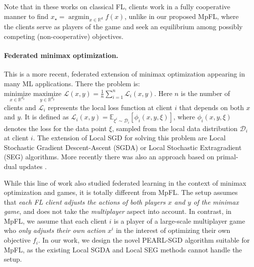 \documentclass{article}
\newcommand{\algname}[1]{{\color{PineGreen}\sf  #1}\xspace}
\newcommand{\cD}{{\mathcal{D}}}
\newcommand{\cL}{{\mathcal{L}}}
\DeclareMathOperator*{\argmin}{argmin}
\newcommand{\reals}{\mathbb{R}}
\newcommand{\abbvname}{\algname{PEARL-SGD}}
\theoremstyle{plain}
\theoremstyle{remark}
\begin{document}
Note that in these works on classical FL, clients work in a fully cooperative manner to find $x_\star = \argmin_{x\in \reals^d} f(x)$, unlike in our proposed MpFL, where the clients serve as players of the game and seek an equilibrium among possibly competing (non-cooperative) objectives.

\paragraph{Federated minimax optimization.}
This is a more recent, federated extension of minimax optimization appearing in many ML applications. 
There the problem is: 
$\underset{x\in \reals^{d_x}}{\textrm{minimize}} \,\, \underset{y\in \reals^{d_y}}{\textrm{maximize}} \,\, \cL(x,y) = \frac{1}{n} \sum_{i=1}^n \cL_i (x,y)$.
Here $n$ is the number of clients and $\cL_i$ represents the local loss function at client $i$ that depends on both $x$ and $y$.
It is defined as $\cL_i (x,y)= \mathbb{E}_{\xi^i \sim \cD_i} [\phi_i(x, y,\xi)]$, 
where $\phi_i(x, y,\xi)$ denotes the loss for the data point $\xi$, sampled from the local data distribution $\cD_i$ at client $i$. 
The extension of Local SGD for solving this problem are Local Stochastic Gradient Descent-Ascent (SGDA) \citep{deng2021local, sharma2022federated} or Local Stochastic Extragradient (SEG) \citep{beznosikov2020distributed,beznosikov2022decentralized} algorithms.
More recently there was also an approach based on primal-dual updates \citep{CondatRichtarik2022_randprox}.

While this line of work also studied federated learning in the context of minimax optimization and games, it is totally different from MpFL. 
The setup assumes that \emph{each FL client adjusts the actions of both players $x$ and $y$ of the minimax game}, and does not take the \emph{multiplayer} aspect into account. 
In contrast, in MpFL, we assume that each client $i$ is a player of a large-scale multiplayer game who \emph{only adjusts their own action $x^i$} in the interest of optimizing their own objective $f_i$.
In our work, we design the novel \abbvname algorithm suitable for MpFL, 
as the existing Local SGDA and Local SEG methods cannot handle the setup.
\end{document}
